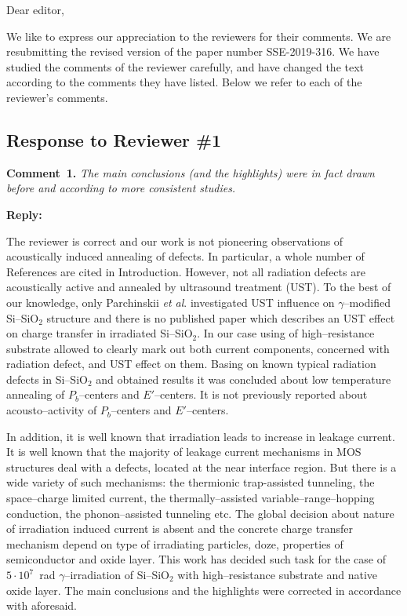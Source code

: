 \documentclass[aip,jap,preprint]{revtex4-1}
\begin{document}
Dear editor,

We like to express our appreciation to the reviewers for their comments.
We are resubmitting the revised version of the paper number  SSE-2019-316.
We have studied the comments of the reviewer carefully, and have changed the text according to the comments they
have listed.
Below we refer to each of the reviewer’s comments.



\subsection*{Response to Reviewer \#1 }

\noindent
\textcolor[rgb]{0.00,0.50,1.00}{\textbf{Comment~1.}}
\emph{The main conclusions (and the highlights) were in fact drawn before and according to more consistent studies.}

\noindent
\textcolor[rgb]{0.51,0.00,0.00}{\textbf{Reply:}}

The reviewer is correct and our work is not pioneering observations of acoustically induced annealing of defects.
In particular, a whole number of References are cited in Introduction.
However, not all radiation defects are acoustically active and annealed by ultrasound treatment (UST).
To the best of our knowledge, only Parchinskii \emph{et al}. \cite{Parchinskii2000,Parchinskii2006} investigated UST influence on
$\gamma$--modified Si--SiO$_2$ structure and there is no published paper which describes an UST effect on charge transfer in irradiated Si--SiO$_2$.
In our case using of high--resistance substrate allowed to clearly mark out both current components, concerned with radiation defect, and UST effect on them.
Basing on known typical radiation defects in Si--SiO$_2$ and obtained results it was concluded about low temperature annealing of $P_b$--centers and $E'$--centers.
It is not previously reported about acousto--activity of  $P_b$--centers and $E'$--centers.

In addition, it is well known that irradiation leads to increase in leakage current.
It is well known that the majority of leakage current mechanisms in MOS structures
deal with a defects, located at the near interface region.
But there is a wide variety of such mechanisms:
the thermionic trap-assisted tunneling,
the space--charge limited current,
the thermally--assisted variable--range--hopping conduction,
the phonon--assisted tunneling etc.
The global decision about nature of irradiation induced current is absent
and the concrete charge transfer mechanism depend on type of irradiating particles, doze,  properties of semiconductor and oxide layer.
This work has decided such task for the case of $5\cdot10^7$~rad $\gamma$--irradiation of Si--SiO$_2$ with high--resistance substrate and native oxide layer.
The main conclusions and the highlights were corrected in accordance with aforesaid.
\end{document}
